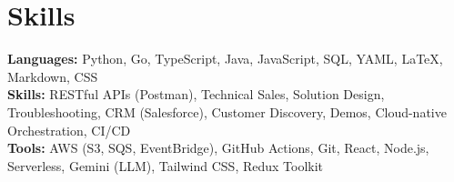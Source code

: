 \documentclass[11pt]{article}       %
\begin{document}
\vspace{-18.5pt}

\section*{Skills}
\textbf{Languages:} Python, Go, TypeScript, Java, JavaScript, SQL, YAML, LaTeX, Markdown, CSS\\
\textbf{Skills:} RESTful APIs (Postman), Technical Sales, Solution Design, Troubleshooting, CRM (Salesforce), Customer Discovery, Demos, Cloud-native Orchestration, CI/CD\\
\textbf{Tools:} AWS (S3, SQS, EventBridge), GitHub Actions, Git, React, Node.js, Serverless, Gemini (LLM), Tailwind CSS, Redux Toolkit\\

\vspace{-6.5pt}
\end{document}

